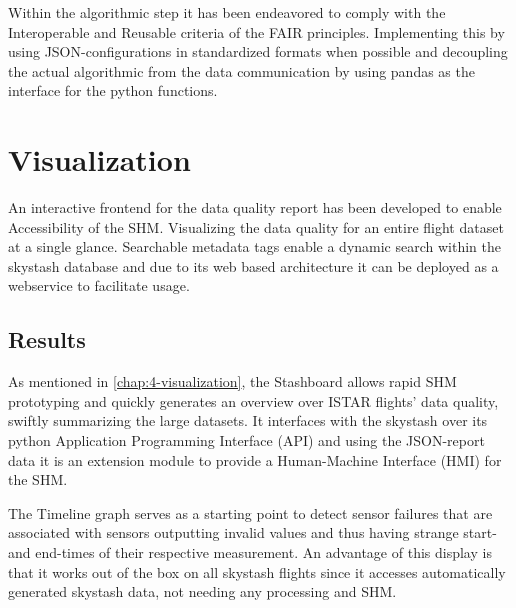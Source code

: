 Within the algorithmic step it has been endeavored to comply with the Interoperable and Reusable criteria of the FAIR principles. Implementing this by using JSON-configurations in standardized formats when possible and decoupling the actual algorithmic from the data communication by using pandas as the interface for the python functions.

%

\section{Visualization}
An interactive frontend for the data quality report has been developed to enable Accessibility of the SHM. Visualizing the data quality for an entire flight dataset at a single glance. Searchable metadata tags enable a dynamic search within the skystash database and due to its web based architecture it can be deployed as a webservice to facilitate usage.

\subsection{Results}
As mentioned in \ref{chap:4-visualization}, the Stashboard allows rapid SHM prototyping and quickly generates an overview over ISTAR flights' data quality, swiftly summarizing the large datasets. It interfaces with the skystash over its python Application Programming Interface (API) and using the JSON-report data it is an extension module to provide a Human-Machine Interface (HMI) for the SHM.

The Timeline graph serves as a starting point to detect sensor failures that are associated with sensors outputting invalid values and thus having strange start- and end-times of their respective measurement. An advantage of this display is that it works out of the box on all skystash flights  since it accesses automatically generated skystash data, not needing any processing and SHM.

